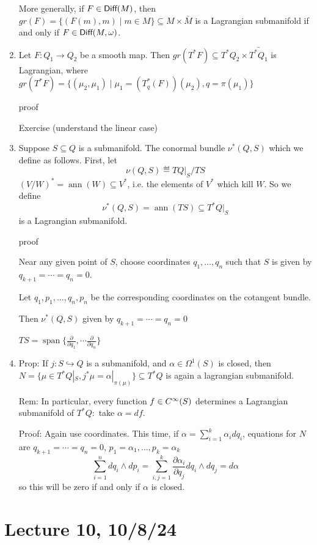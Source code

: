 \documentclass[x11names,reqno,14pt]{extarticle}
\newcommand{\into}{\hookrightarrow}
\newcommand{\pp}[2]{\frac{\partial #1}{\partial #2}}
\DeclareMathOperator{\ann}{ann}
\DeclareMathOperator{\Span}{span}
\begin{document}
\begin{enumerate}
More generally, if $F \in {{\text{\sffamily {Diff}}}}(M)$, then $gr(F) = \{(F(m),m) \mid m \in M \}\subseteq M \times \bar{M}$ is a Lagrangian submanifold if and only if $F \in {{\text{\sffamily {Diff}}}}(M,\omega)$.

\item Let $F:Q_1\to Q_2$ be a smooth map. Then $gr(T^*F) \subseteq T^*Q_2\times\bar{T^*Q_1}$ is Lagrangian, where $gr(T^*F) = \{(\mu_2,\mu_1) \mid \mu_1 = (T_q^*(F))(\mu_2), q = \pi(\mu_1)\}$

proof

Exercise (understand the linear case)

\item Suppose $S\subseteq Q$ is a submanifold. The conormal bundle $\nu^*(Q,S)$ which we define as follows. First, let
\[
\nu(Q,S) \eqdef TQ|_S / TS
\]
$(V/W)^* = \ann(W) \subseteq V^*$, i.e. the elements of $V^*$ which kill $W$. So we define
\[
\nu^*(Q,S) = \ann(TS) \subseteq T^*Q|_S
\]
is a Lagrangian submanifold. 

proof

Near any given point of $S$, choose coordinates $q_1,\dots,q_n$ such that $S$ is given by $q_{k + 1} = \cdots = q_n = 0$. 

Let $q_1,p_1, \dots, q_n,p_n$ be the corresponding coordinates on the cotangent bundle. 

Then $\nu^*(Q,S)$ given by $q_{k+1} = \cdots = q_n = 0$

$TS = \Span\{\pp{}{q_1},\cdots\pp{}{q_n}\}$

\item

Prop: If $j:S \into Q$ is a submanifold, and $\alpha\in\Omega^1(S)$ is closed, then $N = \{\mu\in T^*Q|_S, j^*\mu = \alpha|_{\pi(\mu)}\}\subseteq T^*Q$ is again a lagrangian submanifold. 

Rem: In particular, every function $f \in C^\infty(S)$ determines a Lagrangian submanifold of $T^*Q:$ take $\alpha = df$.

Proof: Again use coordinates. This time, if $\alpha = \sum_{i=1}^k \alpha_idq_i$, equations for $N$ are $q_{k+1} = \cdots = q_n = 0$, $p_1 = \alpha_1, \dots, p_k = \alpha_k$
\[
\sum_{i=1}^n dq_i\wedge dp_i = \sum_{i,j =1}^k \pp{\alpha_i}{q_j}dq_i \wedge dq_j = d\alpha
\]
so this will be zero if and only if $\alpha$ is closed. 
\end{enumerate}

\section*{Lecture 10, 10/8/24}
\end{document}
